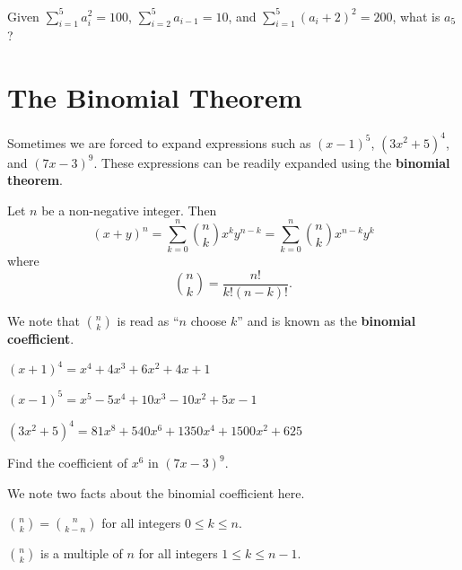 \begin{exercise}
    Given $\displaystyle \sum_{i=1}^5a_i^2 = 100$, $\displaystyle \sum_{i=2}^5a_{i-1} = 10$, and $\displaystyle \sum_{i=1}^5(a_i+2)^2 = 200$, what is $a_5$?
\end{exercise}

\section{The Binomial Theorem}
Sometimes we are forced to expand expressions such as $(x-1)^5$, $(3x^2 + 5)^4$, and $(7x - 3)^9$. These expressions can be readily expanded using the \textbf{binomial theorem}.
\begin{theorem}\label{thrm-binomial}
    Let $n$ be a non-negative integer. Then
    \[
        (x+y)^n = \sum_{k=0}^n {n \choose k}x^ky^{n-k} = \sum_{k=0}^n {n \choose k}x^{n-k}y^k
    \]
    where
    \[
        {n \choose k} = \frac{n!}{k!(n-k)!}.
    \]
\end{theorem}
We note that ${n \choose k}$ is read as ``$n$ choose $k$'' and is known as the \textbf{binomial coefficient}.

\begin{example}
    $(x+1)^4 = x^4 + 4x^3 + 6x^2 + 4x + 1$
\end{example}
\begin{example}
    $(x-1)^5 = x^5-5x^4+10x^3-10x^2+5x-1$
\end{example}
\begin{example}
    $(3x^2 + 5)^4 = 81x^8+540x^6+1350x^4+1500x^2+625$
\end{example}
\begin{exercise}
    Find the coefficient of $x^6$ in $(7x-3)^9$.
\end{exercise}

We note two facts about the binomial coefficient here.
\begin{proposition}
    ${n\choose k} = {n \choose{k-n}}$ for all integers $0 \leq k \leq n$.
\end{proposition}
\begin{proposition}\label{prop-binomial-coefficient-multiple-of-n}
    $n\choose k$ is a multiple of $n$ for all integers $1 \leq k \leq n - 1$.
\end{proposition}

